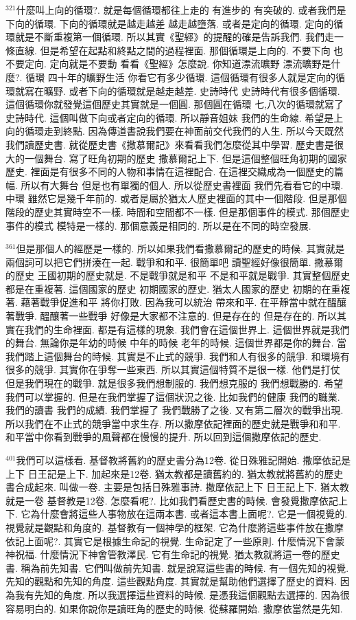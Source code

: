 \documentclass{book}
\begin{document}
$^{321}$什麼叫上向的循環?.
就是每個循環都往上走的 有進步的 有突破的.
或者我們是下向的循環.
下向的循環就是越走越差 越走越墮落.
或者是定向的循環.
定向的循環就是不斷重複第一個循環.
所以其實《聖經》的提醒的確是告訴我們.
我們走一條直線.
但是希望在起點和終點之間的過程裡面.
那個循環是上向的.
不要下向 也不要定向.
定向就是不要動 看看《聖經》怎麼說.
你知道漂流曠野 漂流曠野是什麼?.
循環 四十年的曠野生活 你看它有多少循環.
這個循環有很多人就是定向的循環就寫在曠野.
或者下向的循環就是越走越差.
史詩時代 史詩時代有很多個循環.
這個循環你就發覺這個歷史其實就是一個圓.
那個圓在循環 七,八次的循環就寫了史詩時代.
這個叫做下向或者定向的循環.
所以靜音姐妹 我們的生命線.
希望是上向的循環走到終點.
因為傳道書說我們要在神面前交代我們的人生.
所以今天既然我們讀歷史書.
就從歷史書《撒慕爾記》來看看我們怎麼從其中學習.
歷史書是很大的一個舞台.
寫了旺角初期的歷史 撒慕爾記上下.
但是這個整個旺角初期的國家歷史.
裡面是有很多不同的人物和事情在這裡配合.
在這裡交織成為一個歷史的篇幅.
所以有大舞台 但是也有單獨的個人.
所以從歷史書裡面 我們先看看它的中環.
中環 雖然它是幾千年前的.
或者是屬於猶太人歷史裡面的其中一個階段.
但是那個階段的歷史其實時空不一樣.
時間和空間都不一樣.
但是那個事件的模式.
那個歷史事件的模式 模特是一樣的.
那個意義是相同的.
所以是在不同的時空發展.

$^{361}$但是那個人的經歷是一樣的.
所以如果我們看撒慕爾記的歷史的時候.
其實就是兩個詞可以把它們拼湊在一起.
戰爭和和平.
很簡單吧 讀聖經好像很簡單.
撒慕爾的歷史 王國初期的歷史就是.
不是戰爭就是和平 不是和平就是戰爭.
其實整個歷史都是在重複著.
這個國家的歷史 初期國家的歷史.
猶太人國家的歷史 初期的在重複著.
藉著戰爭促進和平 將你打敗.
因為我可以統治 帶來和平.
在平靜當中就在醞釀著戰爭.
醞釀著一些戰爭 好像是大家都不注意的.
但是存在的 但是存在的.
所以其實在我們的生命裡面.
都是有這樣的現象.
我們會在這個世界上.
這個世界就是我們的舞台.
無論你是年幼的時候 中年的時候 老年的時候.
這個世界都是你的舞台.
當我們踏上這個舞台的時候.
其實是不止式的競爭.
我們和人有很多的競爭.
和環境有很多的競爭.
其實你在爭奪一些東西.
所以其實這個特質不是很一樣.
他們是打仗 但是我們現在的戰爭.
就是很多我們想制服的.
我們想克服的 我們想戰勝的.
希望我們可以掌握的.
但是在我們掌握了這個狀況之後.
比如我們的健康 我們的職業.
我們的讀書 我們的成績.
我們掌握了 我們戰勝了之後.
又有第二層次的戰爭出現.
所以我們在不止式的競爭當中求生存.
所以撒摩依記裡面的歷史就是戰爭和和平.
和平當中你看到戰爭的風聲都在慢慢的提升.
所以回到這個撒摩依記的歷史.

$^{401}$我們可以這樣看.
基督教將舊約的歷史書分為12卷.
從日殊雅記開始.
撒摩依記是上下 日王記是上下.
加起來是12卷.
猶太教都是讀舊約的.
猶太教就將舊約的歷史書合成起來.
叫做一卷.
主要是包括日殊雅事詩.
撒摩依記上下 日王記上下.
猶太教就是一卷 基督教是12卷.
怎麼看呢?.
比如我們看歷史書的時候.
會發覺撒摩依記上下.
它為什麼會將這些人事物放在這兩本書.
或者這本書上面呢?.
它是一個視覺的.
視覺就是觀點和角度的.
基督教有一個神學的框架.
它為什麼將這些事件放在撒摩依記上面呢?.
其實它是根據生命記的視覺.
生命記定了一些原則.
什麼情況下會蒙神祝福.
什麼情況下神會管教澤民.
它有生命記的視覺.
猶太教就將這一卷的歷史書.
稱為前先知書.
它們叫做前先知書.
就是說寫這些書的時候.
有一個先知的視覺.
先知的觀點和先知的角度.
這些觀點角度.
其實就是幫助他們選擇了歷史的資料.
因為我有先知的角度.
所以我選擇這些資料的時候.
是憑我這個觀點去選擇的.
因為很容易明白的.
如果你說你是讀旺角的歷史的時候.
從蘇羅開始.
撒摩依當然是先知.
\end{document}
